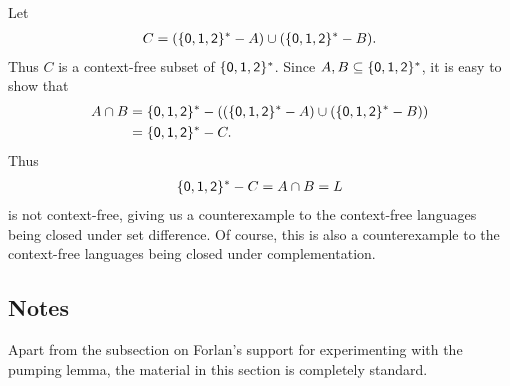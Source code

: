 Let
\begin{gather*}
C=(\{\mathsf{0},\mathsf{1},\mathsf{2}\}^*-A) \cup (\{\mathsf{0},\mathsf{1},\mathsf{2}\}^*-B) .
\end{gather*}
Thus $C$ is a context-free subset of $\{\mathsf{0},\mathsf{1},\mathsf{2}\}^*$.
Since $A,B\subseteq\{\mathsf{0},\mathsf{1},\mathsf{2}\}^*$, it is easy to show that
\begin{align*}
A\cap B &= \{\mathsf{0},\mathsf{1},\mathsf{2}\}^*-
((\{\mathsf{0},\mathsf{1},\mathsf{2}\}^*-A)\cup(\{\mathsf{0},\mathsf{1},\mathsf{2}\}^*-B)) \\
&= \{\mathsf{0},\mathsf{1},\mathsf{2}\}^*-C .
\end{align*}
Thus
\begin{gather*}
\{\mathsf{0},\mathsf{1},\mathsf{2}\}^*-C = A\cap B = L
\end{gather*}
is not context-free, giving us a counterexample to the
context-free languages being closed under set difference.
Of course, this is also a counterexample to the context-free
languages being closed under complementation.
%
%
%
%

\subsection{Notes}

Apart from the subsection on Forlan's support for experimenting with
the pumping lemma, the material in this section is completely
standard.

%
%

